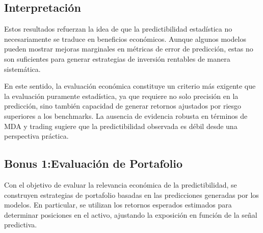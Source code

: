\documentclass[11pt,a4paper]{article}
\begin{document}
	\subsection{Interpretación}
	Estos resultados refuerzan la idea de que la predictibilidad estadística no necesariamente se traduce en beneficios económicos. Aunque algunos modelos pueden mostrar mejoras marginales en métricas de error de predicción, estas no son suficientes para generar estrategias de inversión rentables de manera sistemática.
	
	En este sentido, la evaluación económica constituye un criterio más exigente que la evaluación puramente estadística, ya que requiere no solo precisión en la predicción, sino también capacidad de generar retornos ajustados por riesgo superiores a los benchmarks. La ausencia de evidencia robusta en términos de MDA y trading sugiere que la predictibilidad observada es débil desde una perspectiva práctica.
\newpage	
	\subsection{Bonus 1:Evaluación de Portafolio}
	Con el objetivo de evaluar la relevancia económica de la predictibilidad, se construyen estrategias de portafolio basadas en las predicciones generadas por los modelos. En particular, se utilizan los retornos esperados estimados para determinar posiciones en el activo, ajustando la exposición en función de la señal predictiva.
	
\end{document}
